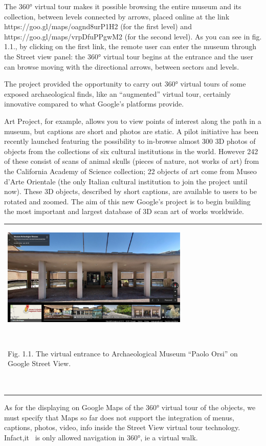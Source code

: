 \documentclass[amsthm,ebook]{saparticle}
\begin{document}
The 360° virtual tour makes it possible browsing the entire museum and its collection, between levels connected by
arrows, placed online at the link https://goo.gl/maps/oagnd8urP1H2 (for the first level) and
https://goo.gl/maps/vrpDfuPPgwM2 (for the second level). As you can see in fig. 1.1., by clicking on the first link,
the remote user can enter the museum through the Street view panel: the 360° virtual tour begins at the entrance and
the user can browse moving with the directional arrows, between sectors and levels.

The project provided the opportunity to carry out 360° virtual tours of some exposed archaeological finds, like an
“augmented” virtual tour, certainly innovative compared to what Google’s platforms provide. 

Art Project, for example, allows you to view points of interest along the path in a museum, but captions are short and
photos are static. A pilot initiative has been recently launched featuring the possibility to in-browse almost 300 3D
photos of objects from the collections of six cultural institutions in the world. However 242 of these consist of scans
of animal skulls (pieces of nature, not works of art) from the California Academy of Science collection; 22 objects of
art come from Museo d’Arte Orientale (the only Italian cultural institution to join the project until now). These 3D
objects, described by short captions, are available to users to be rotated and zoomed. The aim of this new Google’s
project is to begin building the most important and largest database of 3D scan art of works worldwide. 

\begin{flushleft}
\tablefirsthead{}
\tablehead{}
\tabletail{}
\tablelasttail{}
\begin{supertabular}{m{10.872cm}}
{\centering  \includegraphics[width=8.911cm,height=4.632cm]{EAGLE2016BONACINIPilotprojectatPaoloOrsiMuseum-img001.jpg}
\par}

~

Fig. 1.1. The virtual entrance to Archaeological Museum “Paolo Orsi” on Google Street View. 

~
\\
\end{supertabular}
\end{flushleft}
As for the displaying on Google Maps of the 360° virtual tour of the objects, we must specify that Maps so far does not
support the integration of menus, captions, photos, video, info inside the Street View virtual tour technology.
Infact,it \ is only allowed navigation in 360°, ie a virtual walk.
\end{document}
